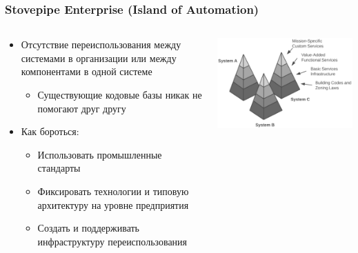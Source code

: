 \documentclass[xetex,mathserif,serif]{beamer}
\begin{document}
    \begin{frame}
        \frametitle{Stovepipe Enterprise (Island of Automation)}
        \begin{columns}
            \begin{column}{0.6\textwidth}
                \begin{itemize}
                    \item Отсутствие переиспользования между системами в организации или между компонентами в одной системе
                    \begin{itemize}
                        \item Существующие кодовые базы никак не помогают друг другу
                    \end{itemize}
                    \item Как бороться:
                    \begin{itemize}
                        \item Использовать промышленные стандарты
                        \item Фиксировать технологии и типовую архитектуру на уровне предприятия
                        \item Создать и поддерживать инфраструктуру переиспользования
                    \end{itemize}
                \end{itemize}
            \end{column}
            \begin{column}{0.4\textwidth}
                \begin{center}
                    \includegraphics[width=\textwidth]{islandOfAutomation.png} \\

\end{center}
\end{column}
\end{columns}
\end{frame}
\end{document}
